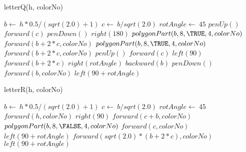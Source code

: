\documentclass[a4paper,10pt]{article}
\begin{document}
\begin{algorithm}
\caption{letterQ(h, colorNo)}
\begin{algorithmic}[5]

\STATE {}
\STATE {}
  \STATE \(b\gets\ h*0.5/(sqrt(2.0)+1)\)
  \STATE \(c\gets\ b/sqrt(2.0)\)
  \STATE \(rotAngle\gets\ 45\)
  \STATE \(penUp()\)
  \STATE \(forward(c)\)
  \STATE \(penDown()\)
  \STATE \(right(180)\)
  \STATE {}
  \STATE {}
  \STATE \(polygonPart(b,8,\TRUE,4,colorNo)\)
  \STATE \(forward(b+2*c,colorNo)\)
  \STATE {}
  \STATE {}
  \STATE \(polygonPart(b,8,\TRUE,4,colorNo)\)
  \STATE \(forward(b+2*c,colorNo)\)
  \STATE \(penUp()\)
  \STATE \(forward(c)\)
  \STATE \(left(90)\)
  \STATE \(forward(b+2*c)\)
  \STATE \(right(rotAngle)\)
  \STATE \(backward(b)\)
  \STATE \(penDown()\)
  \STATE \(forward(b,colorNo)\)
  \STATE \(left(90+rotAngle)\)

\end{algorithmic}
\end{algorithm}


\begin{algorithm}
\caption{letterR(h, colorNo)}
\begin{algorithmic}[5]

\STATE {}
\STATE {}
  \STATE \(b\gets\ h*0.5/(sqrt(2.0)+1)\)
  \STATE \(c\gets\ b/sqrt(2.0)\)
  \STATE \(rotAngle\gets\ 45\)
  \STATE \(forward(h,colorNo)\)
  \STATE \(right(90)\)
  \STATE \(forward(c+b,colorNo)\)
  \STATE {}
  \STATE {}
  \STATE \(polygonPart(b,8,\FALSE,4,colorNo)\)
  \STATE \(forward(c,colorNo)\)
  \STATE \(left(90+rotAngle)\)
  \STATE \(forward(sqrt(2.0)*(b+2*c),colorNo)\)
  \STATE \(left(90+rotAngle)\)

\end{algorithmic}
\end{algorithm}
\end{document}
